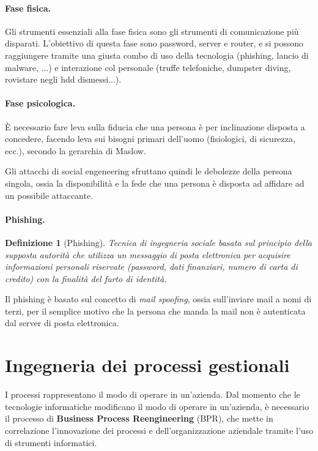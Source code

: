 \documentclass[a4paper, 11pt]{article}
\newtheorem{definit}{Definizione}[subsection]
\begin{document}
	\paragraph{Fase fisica.} Gli strumenti essenziali alla fase fisica sono gli strumenti di comunicazione più disparati. L'obiettivo di questa fase sono password, server e router, e si possono raggiungere tramite una giusta combo di uso della tecnologia (phishing, lancio di malware, ...) e interazione col personale (truffe telefoniche, dumpster diving, rovistare negli hdd dismessi...).
	
	\paragraph{Fase psicologica.} È necessario fare leva sulla fiducia che una persona è per inclinazione disposta a concedere, facendo leva sui bisogni primari dell'uomo (fisiologici, di sicurezza, ecc.), secondo la gerarchia di Maslow. 
	
	Gli attacchi di social engeneering sfruttano quindi le debolezze della persona singola, ossia la disponibilità e la fede che una persona è disposta ad affidare ad un possibile attaccante.
	
	\paragraph{Phishing.} \begin{definit}[Phishing]
		Tecnica di ingegneria sociale basata sul principio della supposta autorità che utilizza un messaggio di posta elettronica per acquisire informazioni personali riservate (password, dati finanziari, numero di carta di credito) con la finalità del furto di identità.
	\end{definit}

	Il phishing è basato sul concetto di \textit{mail spoofing}, ossia sull'inviare mail a nomi di terzi, per il semplice motivo che la persona che manda la mail non è autenticata dal server di posta elettronica.
	
	\section{Ingegneria dei processi gestionali}
	
	I processi rappresentano il modo di operare in un'azienda. Dal momento che le tecnologie informatiche modificano il modo di operare in un'azienda, è necessario il processo di \textbf{Business Process Reengineering} (BPR), che mette in correlazione l'innovazione dei processi e dell'organizzazione aziendale tramite l'uso di strumenti informatici.
	
\end{document}
